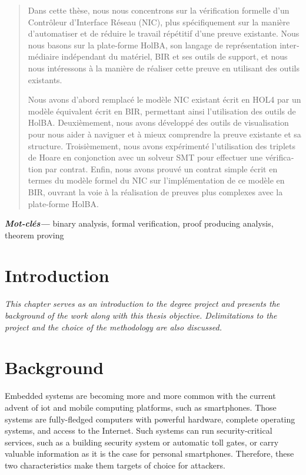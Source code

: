 \documentclass[10pt,a4paper]{article}
\begin{document}
{\begin{otherlanguage}{french}
\begin{abstract}
    Dans cette thèse, nous nous concentrons sur la vérification formelle d'un Contrôleur d'Interface Réseau (NIC), plus spécifiquement sur la manière d'automatiser et de réduire le travail répétitif d'une preuve existante. Nous nous basons sur la plate-forme HolBA, son langage de représentation intermédiaire indépendant du matériel, BIR et ses outils de support, et nous nous intéressons à la manière de réaliser cette preuve en utilisant des outils existants.

    Nous avons d'abord remplacé le modèle NIC existant écrit en HOL4 par un modèle équivalent écrit en BIR, permettant ainsi l'utilisation des outils de HolBA. Deuxièmement, nous avons développé des outils de visualisation pour nous aider à naviguer et à mieux comprendre la preuve existante et sa structure. Troisièmement, nous avons expérimenté l'utilisation des triplets de Hoare en conjonction avec un solveur SMT pour effectuer une vérification par contrat. Enfin, nous avons prouvé un contrat simple écrit en termes du modèle formel du NIC sur l'implémentation de ce modèle en BIR, ouvrant la voie à la réalisation de preuves plus complexes avec la plate-forme HolBA.
  \end{abstract}
\end{otherlanguage}
{\small\textbf{\textit{Mot-clés---}} binary analysis, formal verification, proof producing analysis, theorem proving}
}

\vspace{2cm}
\restoregeometry
{}
\fontsize{10}{12}\selectfont


\section{Introduction}
\textit{This chapter serves as an introduction to the degree project and presents the background of the work along with this thesis objective. Delimitations to the project and the choice of the methodology are also discussed.}

\section{Background}

Embedded systems are becoming more and more common with the current advent of {iot} and mobile computing platforms, such as smartphones. Those systems are fully-fledged computers with powerful hardware, complete operating systems, and access to the Internet. Such systems can run security-critical services, such as a building security system or automatic toll gates, or carry valuable information as it is the case for personal smartphones. Therefore, these two characteristics make them targets of choice for attackers.
\end{document}
